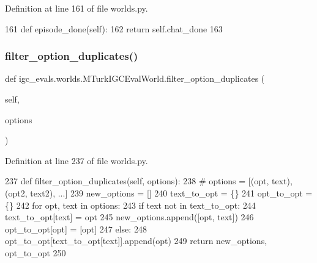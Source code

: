 Definition at line 161 of file worlds.\+py.


\begin{DoxyCode}
161     \textcolor{keyword}{def }episode\_done(self):
162         \textcolor{keywordflow}{return} self.chat\_done
163 
\end{DoxyCode}
\mbox{\label{classigc__evals_1_1worlds_1_1MTurkIGCEvalWorld_a93a8b179951ffcfac7c07da5da696e39}} 
\subsubsection{\texorpdfstring{filter\+\_\+option\+\_\+duplicates()}{filter\_option\_duplicates()}}
{\footnotesize\ttfamily def igc\+\_\+evals.\+worlds.\+M\+Turk\+I\+G\+C\+Eval\+World.\+filter\+\_\+option\+\_\+duplicates (\begin{DoxyParamCaption}\item[{}]{self,  }\item[{}]{options }\end{DoxyParamCaption})}



Definition at line 237 of file worlds.\+py.


\begin{DoxyCode}
237     \textcolor{keyword}{def }filter\_option\_duplicates(self, options):
238         \textcolor{comment}{# options = [(opt, text), (opt2, text2), ...]}
239         new\_options = []
240         text\_to\_opt = \{\}
241         opt\_to\_opt = \{\}
242         \textcolor{keywordflow}{for} opt, text \textcolor{keywordflow}{in} options:
243             \textcolor{keywordflow}{if} text \textcolor{keywordflow}{not} \textcolor{keywordflow}{in} text\_to\_opt:
244                 text\_to\_opt[text] = opt
245                 new\_options.append([opt, text])
246                 opt\_to\_opt[opt] = [opt]
247             \textcolor{keywordflow}{else}:
248                 opt\_to\_opt[text\_to\_opt[text]].append(opt)
249         \textcolor{keywordflow}{return} new\_options, opt\_to\_opt
250 
\end{DoxyCode}
\mbox{\label{classigc__evals_1_1worlds_1_1MTurkIGCEvalWorld_af15ae6901cfd80ff6b3253294f0f46c6}} 
